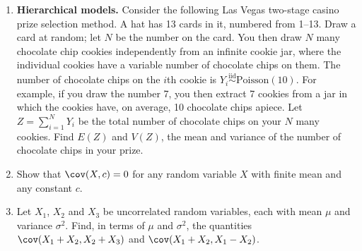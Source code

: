 \documentclass[12pt]{article}
\begin{document}
\begin{enumerate}
\item \textbf{Hierarchical models.}
Consider the following Las Vegas two-stage casino prize selection method.
A hat has 13 cards in it, numbered from 1--13.  Draw a card at random; let $N$ be the number
on the card.
You then draw $N$ many chocolate chip cookies independently
from an  infinite cookie jar, where the individual
cookies have a variable number of chocolate chips on them.
The number of chocolate chips on the $i$th cookie is
$Y_i \stackrel{\text{iid}}{\sim} \text{Poisson}(10)$.
For example,
if you draw the number 7, you then extract 7 cookies
from a jar in which the cookies have, on average,
10 chocolate chips apiece.
Let $Z = \sum_{i=1}^N Y_i$ be the
total number of chocolate chips on your $N$ many cookies.
Find $E(Z)$ and $V(Z)$, the mean and variance
of the number of chocolate chips in your prize.


\item
Show that $\cov(X,c)=0$ for any random variable $X$ with finite mean and any constant $c$.

\item
Let $X_1$, $X_2$ and $X_3$ be uncorrelated random variables, each with mean $\mu$
and variance $\sigma^2$.  Find, in terms of $\mu$ and $\sigma^2$, the quantities
$\cov(X_1+X_2,X_2+X_3)$ and $\cov(X_1+X_2,X_1-X_2)$.

\end{enumerate}
\end{document}
